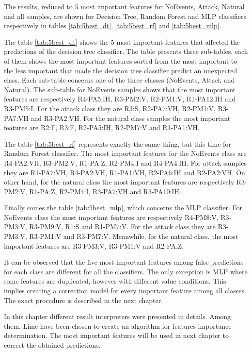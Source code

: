 The results, reduced to 5 most important features for NoEvents, Attack, Natural and all samples, are shown for Decision Tree, Random Forest and MLP classifiers respectively in tables \ref{tab:5best_dt}, \ref{tab:5best_rf} and \ref{tab:5best_mlp}.

The table \ref{tab:5best_dt} shows the 5 most important features that affected the predictions of the decision tree classifier. The table presents three sub-tables, each of them shows the most important features sorted from the most important to the less important that made the decision tree classifier predict an unexpected class. Each sub-table concerns one of the three classes (NoEvents, Attack and Natural). The sub-table for NoEvents samples shows that the most important features are respectively R4-PA5:IH, R3-PM2:V, R2-PM1:V, R1-PA12:IH and R3-PM5:I. For the attack class they are R3:S, R2-PA7:VH, R2-PM1:V, R3-PA7:VH and R3-PA2:VH. For the natural class samples the most important features are R2:F, R3:F, R2-PA5:IH, R2-PM7:V and R1-PA1:VH.

The table \ref{tab:5best_rf} represents exactly the same thing, but this time for Random Forest classifier. The most important features for the NoEvents class are R4-PA2:VH, R3-PM2:V, R1-PA:Z, R2-PM4:I and R4-PA4:IH. For attack samples they are R1-PA7:VH, R4-PA2:VH, R1-PA1:VH, R2-PA6:IH and R2-PA2:VH. On other hand, for the natural class the most important features are respectively R3-PM2:V, R1-PA:Z, R2-PM4:I, R3-PA7:VH and R3-PA10:IH.

Finally comes the table \ref{tab:5best_mlp}, which concerns the MLP classifier. For NoEvents class the most important features are respectively R4-PM8:V, R3-PM3:V, R3-PM9:V, R1:S and R1-PM7:V. For the attack class they are R3-PM3:V, R3-PM1:V and R3-PM7:V. Meanwhile, for the natural class, the most important features are R3-PM3:V, R3-PM1:V and R2-PA:Z.


It can be observed that the five most important features among false predictions for each class are different for all the classifiers. The only exception is MLP where some features are duplicated, however with different value conditions. This implies creating a correction model for every important feature among all classes. The exact procedure is described in the next chapter.

In this chapter different result interpreters were presented in details. Among them, Lime have been chosen to create an algorithm for features importance determination. The most important features will be used in next chapter to correct the obtained predictions. 

